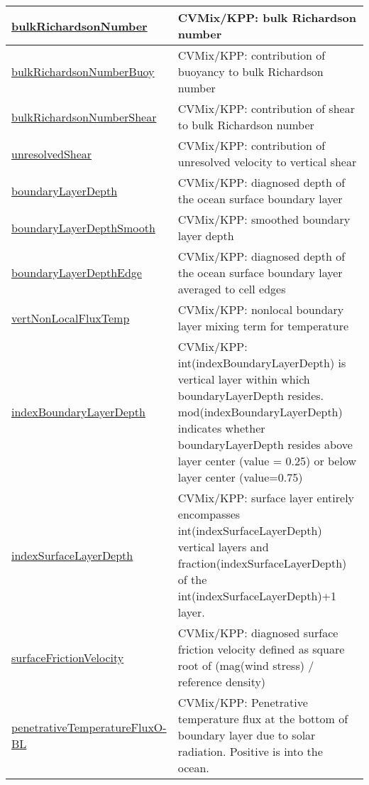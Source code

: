 {\begin{center}
\begin{longtable}{| p{2.0in} | p{4.0in} |}
    \hline
    \hyperref[subsec:var_sec_diagnostics_bulkRichardsonNumber]{bulkRichardsonNumber} & CVMix/KPP: bulk Richardson number \\
    \hline
    \hyperref[subsec:var_sec_diagnostics_bulkRichardsonNumberBuoy]{bulkRichardsonNumberBuoy} & CVMix/KPP: contribution of buoyancy to bulk Richardson number \\
    \hline
    \hyperref[subsec:var_sec_diagnostics_bulkRichardsonNumberShear]{bulkRichardsonNumberShear} & CVMix/KPP: contribution of shear to bulk Richardson number \\
    \hline
    \hyperref[subsec:var_sec_diagnostics_unresolvedShear]{unresolvedShear} & CVMix/KPP: contribution of unresolved velocity to vertical shear \\
    \hline
    \hyperref[subsec:var_sec_diagnostics_boundaryLayerDepth]{boundaryLayerDepth} & CVMix/KPP: diagnosed depth of the ocean surface boundary layer \\
    \hline
    \hyperref[subsec:var_sec_diagnostics_boundaryLayerDepthSmooth]{boundaryLayerDepthSmooth} & CVMix/KPP: smoothed boundary layer depth \\
    \hline
    \hyperref[subsec:var_sec_diagnostics_boundaryLayerDepthEdge]{boundaryLayerDepthEdge} & CVMix/KPP: diagnosed depth of the ocean surface boundary layer averaged to cell edges \\
    \hline
    \hyperref[subsec:var_sec_diagnostics_vertNonLocalFluxTemp]{vertNonLocalFluxTemp} & CVMix/KPP: nonlocal boundary layer mixing term for temperature \\
    \hline
    \hyperref[subsec:var_sec_diagnostics_indexBoundaryLayerDepth]{indexBoundaryLayerDepth} & CVMix/KPP: int(indexBoundaryLayerDepth) is vertical layer within which boundaryLayerDepth resides. mod(indexBoundaryLayerDepth) indicates whether boundaryLayerDepth resides above layer center (value = 0.25) or below layer center (value=0.75) \\
    \hline
    \hyperref[subsec:var_sec_diagnostics_indexSurfaceLayerDepth]{indexSurfaceLayerDepth} & CVMix/KPP: surface layer entirely encompasses int(indexSurfaceLayerDepth) vertical layers and fraction(indexSurfaceLayerDepth) of the int(indexSurfaceLayerDepth)+1 layer. \\
    \hline
    \hyperref[subsec:var_sec_diagnostics_surfaceFrictionVelocity]{surfaceFrictionVelocity} & CVMix/KPP: diagnosed surface friction velocity defined as square root of (mag(wind stress) / reference density) \\
    \hline
    \hyperref[subsec:var_sec_diagnostics_penetrativeTemperatureFluxOBL]{penetrativeTemperatureFluxO-}\hyperref[subsec:var_sec_diagnostics_penetrativeTemperatureFluxOBL]{BL  }& CVMix/KPP: Penetrative temperature flux at the bottom of boundary layer due to solar radiation. Positive is into the ocean. \\

\end{longtable}
\end{center}}
